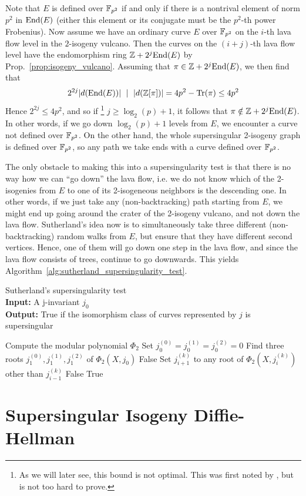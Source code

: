 Note that $E$ is defined over $\mathbb{F}_{p^2}$ if and only if there is a nontrival element of norm $p^2$ in $\mathrm{End}(E)$ (either this element or its conjugate must be the $p^2$-th power Frobenius).
Now assume we have an ordinary curve $E$ over $\mathbb{F}_{p^2}$ on the $i$-th lava flow level in the $2$-isogeny vulcano.
Then the curves on the $(i + j)$-th lava flow level have the endomorphism ring $\mathbb{Z} + 2^j\mathrm{End}(E)$ by Prop.~\ref{prop:isogeny_vulcano}.
Assuming that $\pi \in \mathbb{Z} + 2^j\mathrm{End}(E)$, we then find that
\begin{equation*}
    2^{2j} |d(\mathrm{End}(E))| \ \mid \  |d(\mathbb{Z}[\pi])| = 4p^2 - \mathrm{Tr}(\pi) \leq 4p^2
\end{equation*}
Hence $2^{2j} \leq 4p^2$, and so if
\footnote{As we will later see, this bound is not optimal. This was first noted by \cite{fp_supersingularity_tests}, but is not too hard to prove.}
$j \geq \log_2(p) + 1$, it follows that $\pi \notin \mathbb{Z} + 2^j\mathrm{End}(E)$.
In other words, if we go down $\log_2(p) + 1$ levels from $E$, we encounter a curve not defined over $\mathbb{F}_{p^2}$.
On the other hand, the whole supersingular 2-isogeny graph is defined over $\mathbb{F}_{p^2}$, so any path we take ends with a curve defined over $\mathbb{F}_{p^2}$.

The only obstacle to making this into a supersingularity test is that there is no way how we can ``go down'' the lava flow, i.e. we do not know which of the 2-isogenies from $E$ to one of its 2-isogeneous neighbors is the descending one.
In other words, if we just take any (non-backtracking) path starting from $E$, we might end up going around the crater of the 2-isogeny vulcano, and not down the lava flow.
Sutherland's idea now is to simultaneously take three different (non-backtracking) random walks from $E$, but ensure that they have different second vertices.
Hence, one of them will go down one step in the lava flow, and since the lava flow consists of trees, continue to go downwards.
This yields Algorithm~\ref{alg:sutherland_supersingularity_test}.
\begin{algorithm}
\caption{\label{alg:sutherland_supersingularity_test} Sutherland's supersingularity test\\
\textbf{Input:} A j-invariant $j_0$\\
\textbf{Output:} True if the isomorphism class of curves represented by $j$ is supersingular}
\begin{algorithmic}[1]
\State Compute the modular polynomial $\Phi_2$
\State Set $j_0^{(0)} = j_0^{(1)} = j_0^{(2)} = 0$
\State Find three roots $j_1^{(0)}, j_1^{(1)}, j_1^{(2)}$ of $\Phi_2(X, j_0)$
    \Return False
\EndIf
{}
        \State Set $j_{i + 1}^{(k)}$ to any root of $\Phi_2(X, j_i^{(k)})$ other than $j_{i - 1}^{(k)}$
            \Return False
        \EndIf
    \EndFor
\EndFor
\State \Return True
\end{algorithmic}
\end{algorithm}


\section{Supersingular Isogeny Diffie-Hellman}